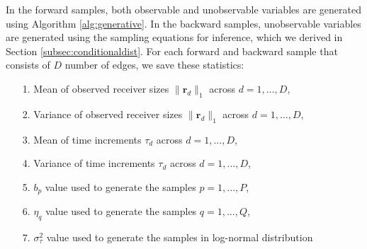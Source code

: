 \documentclass[ba]{imsart}
\numberwithin{equation}{section}
\theoremstyle{plain}
\begin{document}
   In the forward samples, both observable and unobservable variables are generated using Algorithm \ref{alg:generative}. In the backward samples, unobservable variables are generated using the sampling equations for inference, which we derived in Section \ref{subsec:conditionaldist}. For each forward and backward sample that consists of $D$ number of edges, we save these statistics:
   \begin{itemize}
   	\item[1.] Mean of observed receiver sizes $ \lVert \boldsymbol{r}_{d} \rVert_1 $ across $d=1,\ldots,D$,
   	   	\item[2.] Variance of observed receiver sizes $ \lVert \boldsymbol{r}_{d} \rVert_1 $ across $d=1,\ldots,D$,
   	\item[3.] Mean of time increments $\tau_d$ across $d=1,...,D$,
   	   	\item[4.] Variance of time increments $\tau_d$ across $d=1,...,D$,
   	\item[5.] $b_p$ value used to generate the samples $p = 1,...,P$,
   	\item[6.] $\eta_q$ value used to generate the samples $q = 1,...,Q$,
   	\item[7.] $\sigma^2_\tau$ value used to generate the samples in log-normal distribution
   \end{itemize}
   
\end{document}
